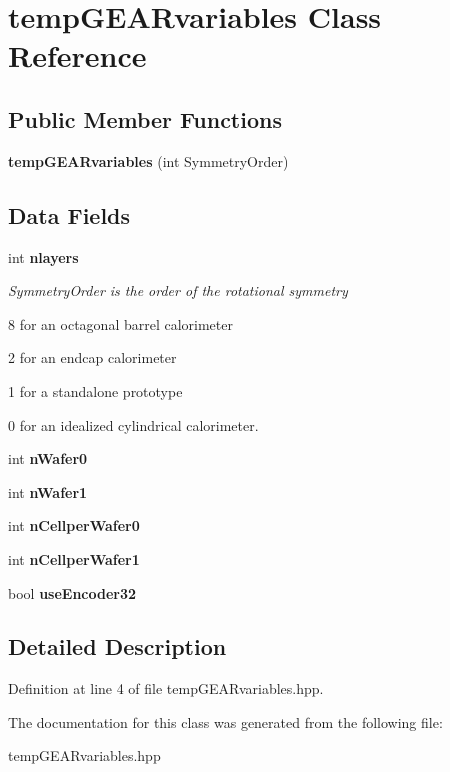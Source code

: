 \section{temp\-G\-E\-A\-Rvariables Class Reference}
\label{classtempGEARvariables}
\subsection*{Public Member Functions}
\begin{DoxyCompactItemize}
\item 
{\bfseries temp\-G\-E\-A\-Rvariables} (int Symmetry\-Order)\label{classtempGEARvariables_a57255f8d771b18a8bd5e5875503086fa}

\end{DoxyCompactItemize}
\subsection*{Data Fields}
\begin{DoxyCompactItemize}
\item 
int {\bf nlayers}\label{classtempGEARvariables_ae0477b8ff1f6593407a77095c2827a4a}

\begin{DoxyCompactList}\small\item\em Symmetry\-Order is the order of the rotational symmetry \par
 8 for an octagonal barrel calorimeter\par
 2 for an endcap calorimeter\par
 1 for a standalone prototype\par
 0 for an idealized cylindrical calorimeter. \end{DoxyCompactList}\item 
int {\bfseries n\-Wafer0}\label{classtempGEARvariables_ad6b0630d8d0e1c5ffec7a196b1a6331a}

\item 
int {\bfseries n\-Wafer1}\label{classtempGEARvariables_ab46b808b0c93323c3b09b30ddfcdbedb}

\item 
int {\bfseries n\-Cellper\-Wafer0}\label{classtempGEARvariables_a77c909e9e84990cea2f2213e2202a37e}

\item 
int {\bfseries n\-Cellper\-Wafer1}\label{classtempGEARvariables_a4b93cd0c376a260363108092ca5fb83c}

\item 
bool {\bfseries use\-Encoder32}\label{classtempGEARvariables_a31918a949ac9be7ab94ccaca8fa58056}

\end{DoxyCompactItemize}


\subsection{Detailed Description}


Definition at line 4 of file temp\-G\-E\-A\-Rvariables.\-hpp.



The documentation for this class was generated from the following file\-:\begin{DoxyCompactItemize}
\item 
temp\-G\-E\-A\-Rvariables.\-hpp\end{DoxyCompactItemize}
